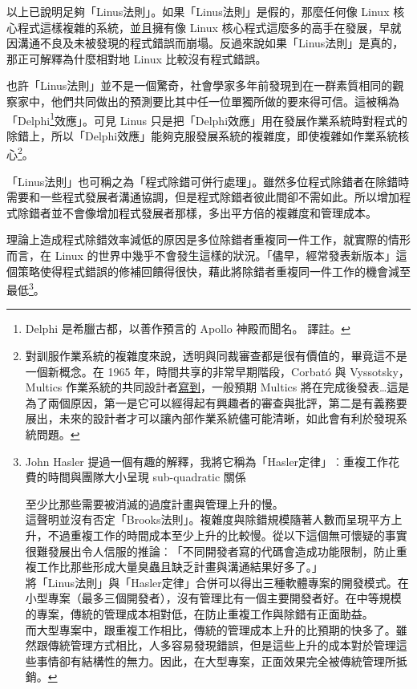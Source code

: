 \documentclass[10pt, b5paper]{book}
\makeatletter
\newcommand*{\shifttext}[2]{%
  \settowidth{\@tempdima}{#2}%
  \makebox[\@tempdima]{\hspace*{#1}#2}%
}
\makeatother
\begin{document}
以上已說明足夠「Linus法則」。如果「Linus法則」是假的，那麼任何像 Linux
核心程式這樣複雜的系統，並且擁有像 Linux
核心程式這麼多的高手在發展，早就因溝通不良及未被發現的程式錯誤而崩塌。反過來說如果「Linus法則」是真的，那正可解釋為什麼相對地
Linux 比較沒有程式錯誤。

也許「Linus法則」並不是一個驚奇，社會學家多年前發現到在一群素質相同的觀察家中，他們共同做出的預測要比其中任一位單獨所做的要來得可信。這被稱為「Delphi\footnote{Delphi
  是希臘古都，以善作預言的 Apollo 神殿而聞名。 \shifttext{1pt}{---}\shifttext{-1pt}{---} 譯註。}效應」。可見
Linus
只是把「Delphi效應」用在發展作業系統時對程式的除錯上，所以「Delphi效應」能夠克服發展系統的複雜度，即使複雜如作業系統核心\footnote{對訓服作業系統的複雜度來說，透明與同裁審查都是很有價值的，畢竟這不是一個新概念。在
  1965 年，時間共享的非常早期階段，Corbató 與 Vyssotsky，Multics
  作業系統的共同設計者\href{http://www.multicians.org/fjcc1.html}{寫到}，一般預期
  Multics
  將在完成後發表\ldots{}這是為了兩個原因，第一是它可以經得起有興趣者的審查與批評，第二是有義務要展出，未來的設計者才可以讓內部作業系統儘可能清晰，如此會有利於發現系統問題。}。

「Linus法則」也可稱之為「程式除錯可併行處理」。雖然多位程式除錯者在除錯時需要和一些程式發展者溝通協調，但是程式除錯者彼此間卻不需如此。所以增加程式除錯者並不會像增加程式發展者那樣，多出平方倍的複雜度和管理成本。

理論上造成程式除錯效率減低的原因是多位除錯者重複同一件工作，就實際的情形而言，在
Linux
的世界中幾乎不會發生這樣的狀況。「儘早，經常發表新版本」這個策略使得程式錯誤的修補回饋得很快，藉此將除錯者重複同一件工作的機會減至最低\footnote{John
  Hasler
  提過一個有趣的解釋，我將它稱為「Hasler定律」︰重複工作花費的時間與團隊大小呈現
  sub-quadratic 關係 \shifttext{1pt}{---}\shifttext{-1pt}{---}
  至少比那些需要被消滅的過度計畫與管理上升的慢。\\這聲明並沒有否定「Brooks法則」。複雜度與除錯規模隨著人數而呈現平方上升，不過重複工作的時間成本至少上升的比較慢。從以下這個無可懷疑的事實很難發展出令人信服的推論︰「不同開發者寫的代碼會造成功能限制，防止重複工作比那些形成大量臭蟲且缺乏計畫與溝通結果好多了。」\\將「Linus法則」與「Hasler定律」合併可以得出三種軟體專案的開發模式。在小型專案（最多三個開發者），沒有管理比有一個主要開發者好。在中等規模的專案，傳統的管理成本相對低，在防止重複工作與除錯有正面助益。\\而大型專案中，跟重複工作相比，傳統的管理成本上升的比預期的快多了。雖然跟傳統管理方式相比，人多容易發現錯誤，但是這些上升的成本對於管理這些事情卻有結構性的無力。因此，在大型專案，正面效果完全被傳統管理所抵銷。}。
\end{document}
